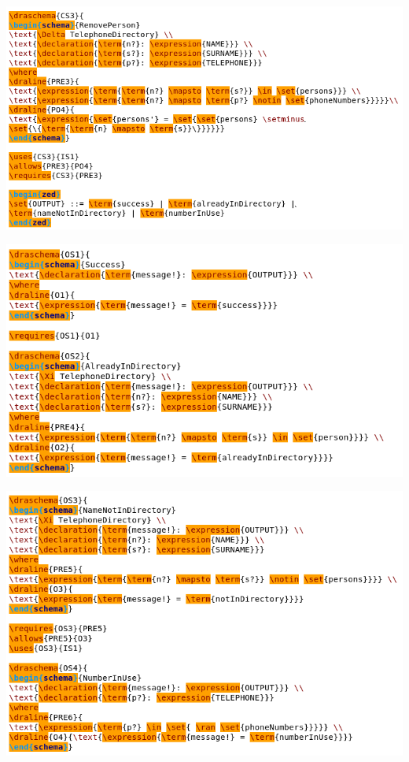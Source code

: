 \noindent \includegraphics[scale=0.5]{examples/nonworkzcga/1n2imaged.png}

\noindent \includegraphics[scale=0.5]{examples/nonworkzcga/1n2imagee.png}

\noindent \includegraphics[scale=0.5]{examples/nonworkzcga/1n2imagef.png}

